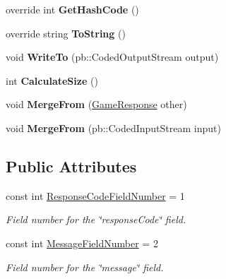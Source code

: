 \begin{DoxyCompactItemize}
override int {\bfseries Get\+Hash\+Code} ()
\item 
\mbox{\label{class_coinche_1_1_google_1_1_protobuf_1_1_game_response_a10d3b1dd26cb1c0ee084cddbcfc1de4a}} 
override string {\bfseries To\+String} ()
\item 
\mbox{\label{class_coinche_1_1_google_1_1_protobuf_1_1_game_response_a7e2f8f7eeeb526f58dc1e3228cf2c04a}} 
void {\bfseries Write\+To} (pb\+::\+Coded\+Output\+Stream output)
\item 
\mbox{\label{class_coinche_1_1_google_1_1_protobuf_1_1_game_response_a7966b0805c13b7883d4f18048aae509f}} 
int {\bfseries Calculate\+Size} ()
\item 
\mbox{\label{class_coinche_1_1_google_1_1_protobuf_1_1_game_response_a8180e18acfa95d164878f96a614c1d78}} 
void {\bfseries Merge\+From} (\hyperlink{class_coinche_1_1_google_1_1_protobuf_1_1_game_response}{Game\+Response} other)
\item 
\mbox{\label{class_coinche_1_1_google_1_1_protobuf_1_1_game_response_a39f44c99beef309bf97a049f870651e3}} 
void {\bfseries Merge\+From} (pb\+::\+Coded\+Input\+Stream input)
\end{DoxyCompactItemize}
\subsection*{Public Attributes}
\begin{DoxyCompactItemize}
\item 
const int \hyperlink{class_coinche_1_1_google_1_1_protobuf_1_1_game_response_ad5b1a7826d766552e707f2c2718c2b21}{Response\+Code\+Field\+Number} = 1
\begin{DoxyCompactList}\small\item\em Field number for the \char`\"{}response\+Code\char`\"{} field.\end{DoxyCompactList}\item 
const int \hyperlink{class_coinche_1_1_google_1_1_protobuf_1_1_game_response_aa71d1d3e67c2941a9a5a56d926d35585}{Message\+Field\+Number} = 2
\begin{DoxyCompactList}\small\item\em Field number for the \char`\"{}message\char`\"{} field.\end{DoxyCompactList}\end{DoxyCompactItemize}

